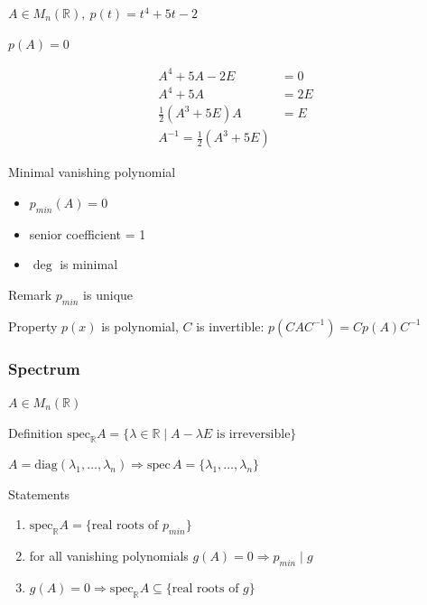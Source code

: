 \documentclass[fullscreen=true, bookmarks=true, hyperref={pdfencoding=unicode}]{beamer}
\begin{document}
\begin{frame}
\begin{example}
  $A \in M_{n}(\mathbb{R}),\ p(t) = t^4 + 5t -2$

  $p(A) = 0$
\end{example}
  \pause
  \begin{align*}
    A^4 + 5A - 2E &= 0 \\
    A^4 + 5A &= 2E \\
    \frac12(A^3 + 5E) A &= E \\
    \boxed{A^{-1} = \frac12(A^3 + 5E)}
  \end{align*}
\end{frame}


\begin{frame}{Minimal vanishing polynomial}
    \begin{itemize}
      \item $p_{min}(A) = 0$
      \item senior coefficient = 1
      \item $\deg$ is minimal
    \end{itemize}

    \pause
    \begin{block}{Remark}
      $p_{min}$ is unique
    \end{block}          

    \pause
    \begin{block}{Property}
      $p(x)$ is polynomial, $C$ is invertible: $p(CAC^{-1}) = Cp(A)C^{-1}$
    \end{block}          
\end{frame}


\begin{frame}
  \frametitle{Spectrum}
  $A \in M_{n}(\mathbb{R})$

  \begin{block}{Definition}
    $\mathrm{spec}_{\mathbb{R}} A = 
    \{ \lambda \in \mathbb{R} \mid A-\lambda E \text{ is irreversible} \}$
  \end{block}

  \pause
  \begin{example}
    $ A = \mathrm{diag}(\lambda_1, \dots, \lambda_n) \Rightarrow
    \mathrm{spec}\, A = \{\lambda_1, \dots, \lambda_n\}$
  \end{example}

  \begin{block}{Statements}
    \begin{enumerate}
      \pause\item $\mathrm{spec}_{\mathbb{R}} A = 
      \{ \text{real roots of } p_{min}\}$
      \pause\item for all vanishing polynomials 
      $g(A) = 0 \Rightarrow p_{min} \mid g$
      \pause\item $g(A) = 0 \Rightarrow \mathrm{spec}_{\mathbb{R}} A \subseteq 
      \{ \text{real roots of } g \}$
    \end{enumerate}
    
  \end{block}
\end{frame}
\end{document}

